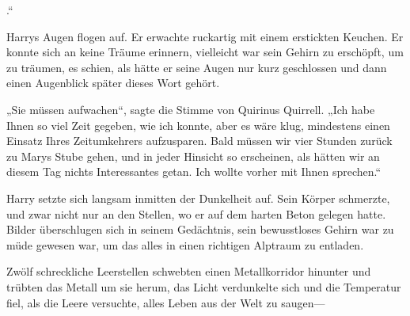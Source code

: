
.“

\hplettrineextrapara
Harrys Augen flogen auf. Er erwachte ruckartig mit einem erstickten Keuchen. Er konnte sich an keine Träume erinnern, vielleicht war sein Gehirn zu erschöpft, um zu träumen, es schien, als hätte er seine Augen nur kurz geschlossen und dann einen Augenblick später dieses Wort gehört.

„Sie müssen aufwachen“, sagte die Stimme von Quirinus Quirrell. „Ich habe Ihnen so viel Zeit gegeben, wie ich konnte, aber es wäre klug, mindestens einen Einsatz Ihres Zeitumkehrers aufzusparen. Bald müssen wir vier Stunden zurück zu Marys Stube gehen, und in jeder Hinsicht so erscheinen, als hätten wir an diesem Tag nichts Interessantes getan. Ich wollte vorher mit Ihnen sprechen.“

Harry setzte sich langsam inmitten der Dunkelheit auf. Sein Körper schmerzte, und zwar nicht nur an den Stellen, wo er auf dem harten Beton gelegen hatte. Bilder überschlugen sich in seinem Gedächtnis, sein bewusstloses Gehirn war zu müde gewesen war, um das alles in einen richtigen Alptraum zu entladen.

Zwölf schreckliche Leerstellen schwebten einen Metallkorridor hinunter und trübten das Metall um sie herum, das Licht verdunkelte sich und die Temperatur fiel, als die Leere versuchte, alles Leben aus der Welt zu saugen—

